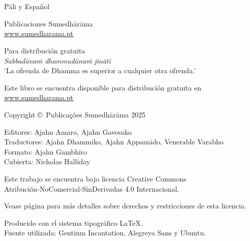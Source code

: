 
\thispagestyle{empty}

\enlargethispage{\baselineskip}

{\centering\small
\setlength{\parskip}{15pt}

{\normalsize
\thetitle\\
\thesubtitle\\
Pāli y Español}

Publicaciones Sumedhārāma\\
\href{http://sumedharama.pt}{www.sumedharama.pt}

Para distribución gratuita\\
\textit{Sabbadānaṁ dhammadānaṁ jināti}\\
‘La ofrenda de Dhamma es superior a cualquier otra ofrenda.’

Este libro se encuentra disponible para distribución gratuita en\\
\href{http://sumedharama.pt}{www.sumedharama.pt}


Copyright \copyright\ Publicações Sumedhārāma 2025

Editores: Ajahn Amaro, Ajahn Gavesako\\
Traductores: Ajahn Dhammiko, Ajahn Appamādo, Venerable Varabho\\
Formato: Ajahn Gambhīro\\
Cubierta: Nicholas Halliday

\vfill

Este trabajo se encuentra bajo licencia Creative Commons\\
Atribución-NoComercial-SinDerivadas 4.0 Internacional.

Vease página \pageref{copyright-details} para más detalles sobre derechos y restricciones de esta licencia.

Producido con el sistema tipográfico \LaTeX.\\
Fuente utilizada: Gentium Incantation, Alegreya Sans y Ubuntu.

\theEditionInfo

}
